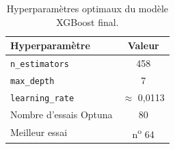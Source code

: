 \begin{table}[h]
\centering
\renewcommand{\arraystretch}{1.3}
\begin{tabular}{p{5cm} c}
\toprule
\textbf{Hyperparamètre} & \textbf{Valeur} \\
\midrule
\texttt{n\_estimators}  & 458 \\
\texttt{max\_depth}     & 7 \\
\texttt{learning\_rate} & $\approx$ 0,0113 \\
Nombre d'essais Optuna  & 80 \\
Meilleur essai          & n\textsuperscript{o} 64 \\
\bottomrule
\end{tabular}
\caption{Hyperparamètres optimaux du modèle XGBoost final.}
\label{tab:annexe-hp}
\end{table}
